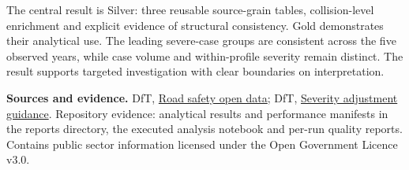 \documentclass[10pt,a4paper]{article}
\begin{document}
The central result is Silver: three reusable source-grain tables, collision-level enrichment and explicit evidence of structural consistency. Gold demonstrates their analytical use. The leading severe-case groups are consistent across the five observed years, while case volume and within-profile severity remain distinct. The result supports targeted investigation with clear boundaries on interpretation.

{\footnotesize\textbf{Sources and evidence.} DfT, \href{https://www.gov.uk/government/statistical-data-sets/road-safety-open-data}{Road safety open data}; DfT, \href{https://www.gov.uk/government/publications/guide-to-severity-adjustments-for-reported-road-casualty-statistics}{Severity adjustment guidance}. Repository evidence: analytical results and performance manifests in the reports directory, the executed analysis notebook and per-run quality reports. Contains public sector information licensed under the Open Government Licence v3.0.}
\end{document}
